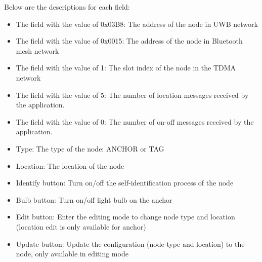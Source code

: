 \documentclass[\main/main.tex]{subfiles}
\begin{document}
Below are the descriptions for each field:
\begin{itemize}
    \item The field with the value of 0x03B8: The address of the node in UWB network
    \item The field with the value of 0x0015: The address of the node in Bluetooth mesh network
    \item The field with the value of 1: The slot index of the node in the TDMA network
    \item The field with the value of 5: The number of location messages received by the application.
    \item The field with the value of 0: The number of on-off messages received by the application.
    \item Type: The type of the node: ANCHOR or TAG
    \item Location: The location of the node
    \item Identify button: Turn on/off the self-identification process of the node
    \item Bulb button: Turn on/off light bulb on the anchor
    \item Edit button: Enter the editing mode to change node type and location (location edit is only available for anchor)
    \item Update button: Update the configuration (node type and location) to the node, only available in editing mode
\end{itemize}

\bib
\end{document}
